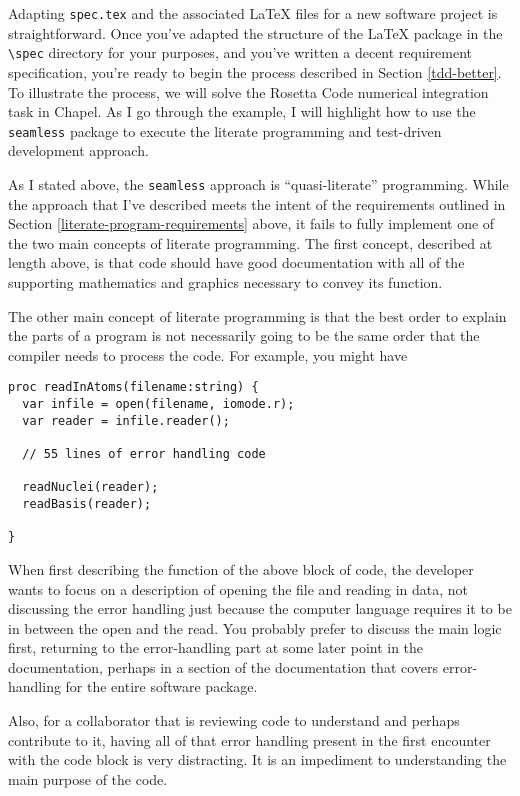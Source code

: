 Adapting \lstinline{spec.tex} and the associated \LaTeX\xspace files for a new software project is straightforward. 
Once you've adapted the structure of the \LaTeX\xspace package in the \lstinline{\spec} directory for your
purposes, and you've written a decent requirement specification, you're ready to begin the process described in
Section \ref{tdd-better}. 
To illustrate the process, we will solve the Rosetta Code numerical integration 
task\cite{rosetta-code-numerical-integration} in Chapel. As I go through the example, I will highlight
how to use the \lstinline{seamless} package to execute the literate programming and test-driven development
approach.

As I stated above, the \lstinline{seamless} approach is ``quasi-literate'' programming.  While the approach
that I've described meets the intent of the requirements outlined in Section 
\ref{literate-program-requirements} above, it fails to fully implement one of the two main concepts of
literate programming.\cite{knuth}
The first concept, described at length above, is that code should have good documentation with all of the
supporting mathematics and graphics necessary to convey its function.

The other main concept of literate programming is that the best order to explain the parts of a program 
is not necessarily going to be the same order that the compiler needs to process the code. 
For example, you might have

\begin{verbatim}
proc readInAtoms(filename:string) {
  var infile = open(filename, iomode.r);
  var reader = infile.reader();

  // 55 lines of error handling code

  readNuclei(reader);
  readBasis(reader);

}
\end{verbatim}

When first describing the function of the above block of code, the developer wants to focus on a description of 
opening the file 
and reading in data, not discussing the error handling just because the computer language requires it to be in 
between the open and the read. You probably prefer to discuss the main logic first, returning to the error-handling 
part at some later point in the documentation, perhaps in a section of the documentation that covers error-handling
for the entire software package.


Also, for a collaborator that is reviewing code to understand and perhaps contribute to it, having all of that
error handling present in the first encounter with the code block is very distracting. It is an impediment to 
understanding the main purpose of the code.

